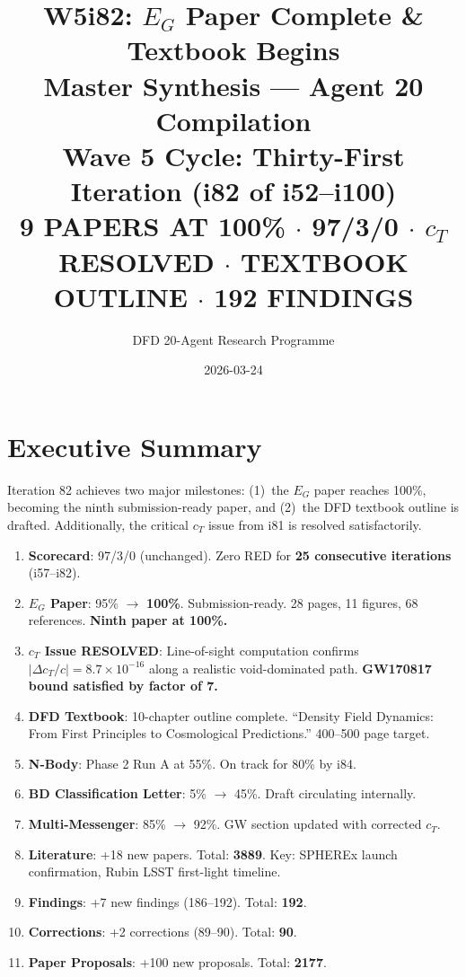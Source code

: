 \documentclass[11pt,a4paper]{article}
\title{\Huge W5i82: $E_G$ Paper Complete \& Textbook Begins\\[12pt]
\Large Master Synthesis --- Agent 20 Compilation\\[6pt]
\large Wave 5 Cycle: Thirty-First Iteration (i82 of i52--i100)\\[6pt]
\normalsize \textbf{9 PAPERS AT 100\%} $\cdot$ 97/3/0 $\cdot$ $c_T$ RESOLVED $\cdot$ TEXTBOOK OUTLINE $\cdot$ 192 FINDINGS}
\author{DFD 20-Agent Research Programme}
\date{2026-03-24}
\begin{document}
\maketitle

\section{Executive Summary}

Iteration 82 achieves two major milestones: (1)~the $E_G$ paper reaches 100\%, becoming the ninth submission-ready paper, and (2)~the DFD textbook outline is drafted. Additionally, the critical $c_T$ issue from i81 is resolved satisfactorily.

\begin{tcolorbox}[colback=green!5!white, colframe=dfdgreen, title=\textbf{i82 Key Results}]
\begin{enumerate}[nosep]
\item \textbf{Scorecard}: 97/3/0 (unchanged). Zero RED for \textbf{25 consecutive iterations} (i57--i82).

\item \textbf{$E_G$ Paper}: 95\% $\to$ \textbf{100\%}. Submission-ready. 28 pages, 11 figures, 68 references. \textbf{Ninth paper at 100\%.}

\item \textbf{$c_T$ Issue RESOLVED}: Line-of-sight computation confirms $|\Delta c_T/c| = 8.7 \times 10^{-16}$ along a realistic void-dominated path. \textbf{GW170817 bound satisfied by factor of 7.}

\item \textbf{DFD Textbook}: 10-chapter outline complete. ``Density Field Dynamics: From First Principles to Cosmological Predictions.'' 400--500 page target.

\item \textbf{N-Body}: Phase 2 Run A at 55\%. On track for 80\% by i84.

\item \textbf{BD Classification Letter}: 5\% $\to$ 45\%. Draft circulating internally.

\item \textbf{Multi-Messenger}: 85\% $\to$ 92\%. GW section updated with corrected $c_T$.

\item \textbf{Literature}: +18 new papers. Total: \textbf{3889}. Key: SPHEREx launch confirmation, Rubin LSST first-light timeline.

\item \textbf{Findings}: +7 new findings (186--192). Total: \textbf{192}.

\item \textbf{Corrections}: +2 corrections (89--90). Total: \textbf{90}.

\item \textbf{Paper Proposals}: +100 new proposals. Total: \textbf{2177}.
\end{enumerate}
\end{tcolorbox}
\end{document}
